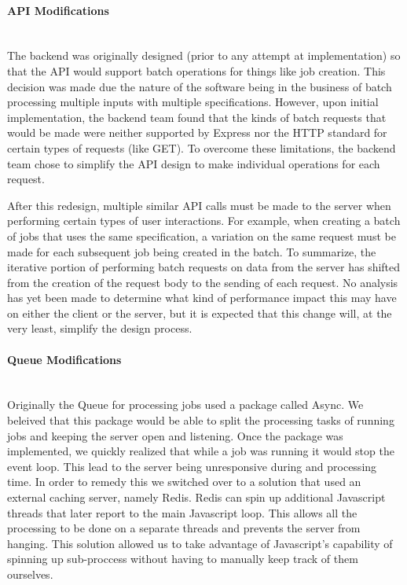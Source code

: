 \paragraph{API Modifications} \mbox{}\\[\paragraphheaderspace]
The backend was originally designed (prior to any attempt at implementation) so that the API would support batch operations for things like job creation. This decision was made due the nature of the software being in the business of batch processing multiple inputs with multiple specifications. However, upon initial implementation, the backend team found that the kinds of batch requests that would be made were neither supported by Express nor the HTTP standard for certain types of requests (like GET). To overcome these limitations, the backend team chose to simplify the API design to make individual operations for each request.\par
After this redesign, multiple similar API calls must be made to the server when performing certain types of user interactions. For example, when creating a batch of jobs that uses the same specification, a variation on the same request must be made for each subsequent job being created in the batch. To summarize, the iterative portion of performing batch requests on data from the server has shifted from the creation of the request body to the sending of each request. No analysis has yet been made to determine what kind of performance impact this may have on either the client or the server, but it is expected that this change will, at the very least, simplify the design process.\par

\paragraph{Queue Modifications} \mbox{}\\[\paragraphheaderspace]
Originally the Queue for processing jobs used a package called Async. We beleived that this package would be able to split the processing tasks of running jobs and keeping the server open and listening. Once the package was implemented, we quickly realized that while a job was running it would stop the event loop. This lead to the server being unresponsive during and processing time. In order to remedy this we switched over to a solution that used an external caching server, namely Redis. Redis can spin up additional Javascript threads that later report to the main Javascript loop. This allows all the processing to be done on a separate threads and prevents the server from hanging. This solution allowed us to take advantage of Javascript's capability of spinning up sub-proccess without having to manually keep track of them ourselves.
